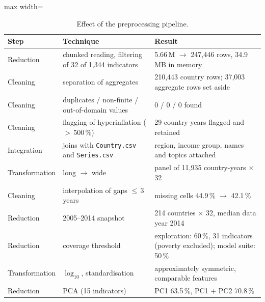 \documentclass[11pt,a4paper]{article}
\begin{document}
\begin{table}[htbp]\centering\small
\caption{Effect of the preprocessing pipeline.}\label{tab:prep}
\begin{adjustbox}{max width=\textwidth}\begin{tabular}{lll}
\toprule
Step & Technique & Result \\
\midrule
Reduction & chunked reading, filtering of 32 of 1,344 indicators & 5.66\,M $\to$ 247,446 rows, 34.9\,MB in memory \\
Cleaning & separation of aggregates & 210,443 country rows; 37,003 aggregate rows set aside \\
Cleaning & duplicates / non-finite / out-of-domain values & 0 / 0 / 0 found \\
Cleaning & flagging of hyperinflation ($>$\,500\,\%) & 29 country-years flagged and retained \\
Integration & joins with \texttt{Country.csv} and \texttt{Series.csv} & region, income group, names and topics attached \\
Transformation & long $\to$ wide & panel of 11,935 country-years $\times$ 32 \\
Cleaning & interpolation of gaps $\le$\,3 years & missing cells 44.9\,\% $\to$ 42.1\,\% \\
Reduction & 2005--2014 snapshot & 214 countries $\times$ 32, median data year 2014 \\
Reduction & coverage threshold & exploration: 60\,\%, 31 indicators (poverty excluded); model suite: 50\,\% \\
Transformation & $\log_{10}$, standardisation & approximately symmetric, comparable features \\
Reduction & PCA (15 indicators) & PC1 63.5\,\%, PC1 + PC2 70.8\,\% \\
\bottomrule
\end{tabular}\end{adjustbox}
\end{table}
\end{document}
